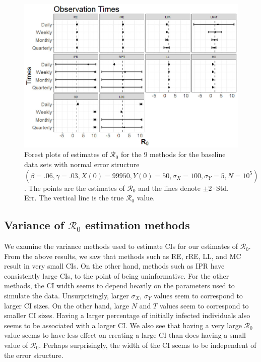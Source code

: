 \documentclass[12pt]{article}
\newcommand{\xxsir}{\ensuremath{9} } %
\newcommand{\rr}{\ensuremath{\mathcal{R}_0}}
\begin{document}
\begin{figure}[H]
	\centering
	\includegraphics[scale=0.5]{images/obs.jpg}
	\caption{Forest plots of estimates of $\rr$ for the \xxsir methods for the baseline data sets with normal error structure $(\beta=.06, \gamma=.03, X(0) = 99950, Y(0)=50, \sigma_X=100, \sigma_Y=5, N=10^5)$.  The points are the estimates of $\rr$ and the lines denote $\pm 2\cdot $Std. Err.  The vertical line is the true $\rr$ value.}\label{fig:obs}
\end{figure}

  





\subsection{Variance of $\rr$ estimation methods}\label{sec:sim-var-res}
We examine the variance methods used to estimate CIs for our estimates of $\rr$.  From the above results, we saw that methods such as RE, rRE, LL, and MC result in very small CIs.  On the other hand, methods such as IPR have consistently large CIs, to the point of being uninformative.  For the other methods, the CI width seems to depend heavily on the parameters used to simulate the data.  Unsurprisingly, larger $\sigma_X$, $\sigma_Y$ values seem to correspond to larger CI sizes.  On the other hand, large $N$ and $T$ values seem to correspond to smaller CI sizes.   Having a larger percentage of initially infected individuals also seems to be associated with a larger CI.  We also see that having a very large $\rr$ value seems to have less effect on creating a large CI than does having a small value of $\rr$.  Perhaps surprisingly, the width of the CI seems to be independent of the error structure.
\end{document}
